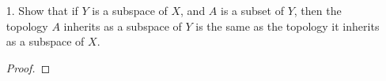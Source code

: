 \documentclass[12pt]{article}
\theoremstyle{definition}
\begin{document}
\begin{enumerate}
\begin{enumerate}
\begin{proof}
                    \end{proof}
            \end{enumerate}
        \item[1.] Show that if $Y$ is a subspace of $X$, and $A$ is a subset of
            $Y$, then the topology $A$ inherits as a subspace of $Y$ is the
            same as the topology it inherits as a subspace of $X$.
                \begin{proof}
                    
                \end{proof}
    \end{enumerate}
\end{document}

